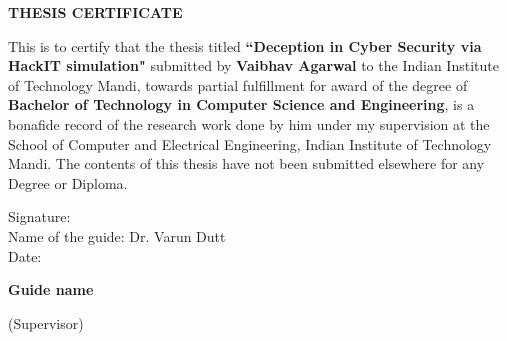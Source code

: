\thispagestyle{empty}
\setcounter{page}{0}
\vspace*{4cm}
\centerline{\Large \bf THESIS CERTIFICATE}
\vspace*{2cm}
\noindent This is to certify that the thesis titled \textbf{``Deception in Cyber Security via HackIT simulation"} submitted by \textbf{Vaibhav Agarwal} to the Indian Institute of Technology Mandi, towards partial fulfillment for award of the degree of \textbf{Bachelor of Technology in Computer Science and Engineering}, is a bonafide record of the research work done by him under my supervision at the School of Computer and Electrical Engineering, Indian Institute of Technology Mandi. The contents of this thesis have not been submitted elsewhere for any Degree or Diploma.\\[3cm]

\begin{minipage}{7cm}
	{\noindent Signature:} \\
 {\noindent Name of the guide: Dr. Varun Dutt}\\
 {\noindent Date:}
	
\end{minipage}
\hfill\begin{minipage}{7cm}
\hfill{\bf Guide name}
\end{minipage}
\hfill\begin{minipage}{14.5cm}
	\hfill{ (Supervisor)}
\end{minipage}\\[1.5cm]

	

\clearpage
\thispagestyle{empty}
~\clearpage


